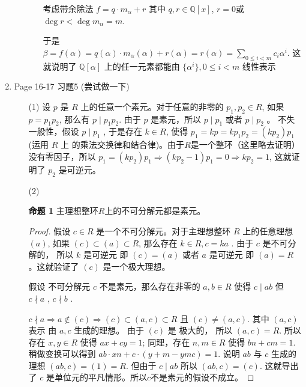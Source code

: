\documentclass{article}
\begin{document}
\begin{spacing}{1.5}
\begin{enumerate}
\begin{enumerate}
\begin{enumerate}
            考虑带余除法 $f = q\cdot m_\alpha + r$ 其中 $q, r\in\mathbb{Q}[x]$, $r=0$或$\deg r < \deg m_\alpha = m$. 

            于是 $\beta = f(\alpha) = q(\alpha)\cdot m_\alpha(\alpha) + r(\alpha) = r(\alpha) = \sum_{0\leq i < m} c_i \alpha^i$. 
            这就说明了 $\mathbb{Q}[\alpha]$ 上的任一元素都能由 $\{\alpha^i\}, 0\leq i < m$ 线性表示

        \end{enumerate}
    
    \end{enumerate}
    
    \item Page 16-17 习题5 (尝试做一下)
    \begin{enumerate}
        \item [(1)] 设 $p$ 是 $R$ 上的任意一个素元。对于任意的非零的 $p_1,p_2\in R$, 如果 $p = p_1p_2$, 那么有 $p \mid p_1p_2$. 由于 $p$ 是素元，所以 
        $p \mid p_1$ 或者 $p \mid p_2$ 。 不失一般性，假设 $p \mid p_1$ , 于是存在 $k\in R$, 使得 $p_1 = kp = kp_1p_2 = (kp_2)p_1$ (运用 $R$ 上
        的乘法交换律和结合律)。由于$R$是一个整环（这里略去证明）没有零因子，所以 $p_1 = (kp_2)p_1 \Rightarrow (kp_2 - 1)p_1 = 0 \Rightarrow kp_2 = 1$, 
        这就证明了 $p_2$ 是可逆元。

        \item [(2)] 
        
        \textbf{命题 1} 主理想整环$R$上的不可分解元都是素元。
        \begin{proof}
            假设 $c\in R$ 是一个不可分解元。对于主理想整环 $R$ 上的任意理想 $(a)$, 如果 $(c)\subset (a)\subset R$, 那么存在 $k\in R, c = ka$ .
            由于 $c$ 是不可分解的， 所以 $k$ 是可逆元 即 $(c) = (a)$ 或者 $a$ 是可逆元 即 $(a) = R$ 。这就验证了 $(c)$ 是一个极大理想。

            假设 不可分解元 $c$ 不是素元，那么存在非零的 $a, b\in R$ 使得 $c \mid ab$ 但 $c \nmid a$ , $c \nmid b$ .

            $c \nmid a \Rightarrow a \notin (c) \Rightarrow (c) \subset (a, c) \subset R$ 且 $(c) \ne (a, c)$. 其中 $(a, c)$ 表示 由 $a, c$ 生成的理想。
            由于 $(c)$ 是 极大的， 所以 $(a, c) = R$. 所以存在 $x, y\in R$ 使得 $ax + cy = 1$; 同理，存在 $n, m\in R$ 使得 $bn + cm = 1$. 
            稍做变换可以得到 $ab\cdot xn + c\cdot (y + m - ymc) = 1$. 说明 $ab$ 与 $c$ 生成的理想 $(ab, c) = (1) = R$. 但由于 $c \mid ab$ 所以 $(ab, c) = (c)$.
            这就导出了 $c$ 是单位元的平凡情形。所以$c$不是素元的假设不成立。
        \end{proof}
        

\end{enumerate}
\end{enumerate}
\end{spacing}
\end{document}
